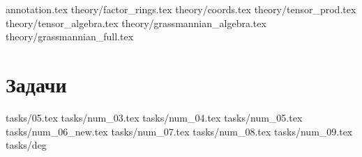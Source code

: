 \documentclass[14pt]{extarticle}
\begin{document}
	\tableofcontents
	\clearpage
	{annotation.tex}
	\clearpage
	{theory/factor_rings.tex}
	{theory/coords.tex}
	{theory/tensor_prod.tex}
	{theory/tensor_algebra.tex}
	{theory/grassmannian_algebra.tex}
	{theory/grassmannian_full.tex}
	\clearpage
	\part{Задачи}
	{tasks/05.tex}
	{tasks/num_03.tex}
	{tasks/num_04.tex}
	{tasks/num_05.tex}
	{tasks/num_06_new.tex}
	{tasks/num_07.tex}
	{tasks/num_08.tex}
	{tasks/num_09.tex}
	{tasks/deg}

	\clearpage
	\printbibliography
\end{document}
